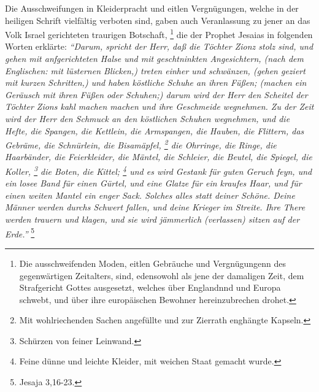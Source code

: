 Die Ausschweifungen in Kleiderpracht und eitlen Vergnügungen, welche in der
heiligen Schrift vielfältig verboten sind, gaben auch
Veranlassung zu jener an
das Volk Israel gerichteten traurigen Botschaft,
\footnote{
    Die ausschweifenden Moden, eitlen Gebräuche und Vergnügungenn des gegenwärtigen
    Zeitalters, sind,
    edensowohl als jene der damaligen Zeit, dem Strafgericht Gottes ausgesetzt,
    welches über Englandnnd und Europa schwebt, und über ihre europäischen
    Bewohner hereinzubrechen drohet.}
die der Prophet Jesaias in folgenden Worten erklärte:
\textit{
    "`Darum, spricht der Herr, daß die Töchter Zionz stolz sind, und gehen mit  anfgerichteten Halse und mit geschtninkten
    Angesichtern, (nach dem Englischen: mit lüsternen Blicken,) treten einher und
    schwänzen, (gehen geziert mit kurzen Schritten,) und haben köstliche Schuhe an
    ihren Füßen; (machen ein Geräusch mit ihren Füßen oder Schuhen;) darum wird der
    Herr den Scheitel der Töchter Zions kahl machen machen und ihre Geschmeide
    wegnehmen. Zu der Zeit wird der Herr den Schmuck an den köstlichen Schuhen
    wegnehmen, und die Hefte, die Spangen, die Kettlein, die Armspangen, die
    Hauben, die Flittern, das Gebräme, die Schnürlein, die Bisamäpfel,
    \footnote{
        Mit wohlriechenden Sachen angefüllte und zur Zierrath
        enghängte Kapseln.}
    die Ohrringe, die Ringe, die Haarbänder, die Feierkleider,
    die Mäntel, die Schleier, die Beutel, die Spiegel, die Koller,
    \footnote{Schürzen von feiner Leinwand.}
    die Boten, die Kittel;
    \footnote{Feine dünne und leichte
        Kleider, mit weichen Staat gemacht wurde.} und es wird Gestank für guten
        Geruch feyn, und ein losee Band für einen Gürtel, und eine Glatze für ein
        kraufes Haar, und für einen weiten Mantel ein enger Sack. Solches alles
	statt deiner Schöne. Deine Männer werden durchs Schwert fallen, und deine
	Krieger im Streite. Ihre There werden trauern und klagen, und sie wird
	jämmerlich (verlassen) sitzen auf der Erde."'}
\footnote{Jesaja 3,16-23.}

\medskip

